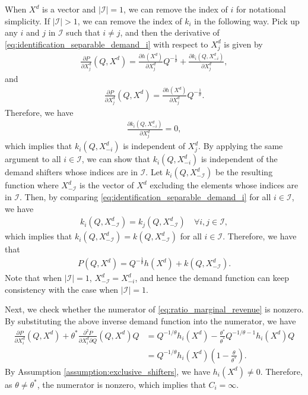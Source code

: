 \documentclass[11pt, a4paper]{article}
\theoremstyle{remark}
\begin{document}
When $X^{d}$ is a vector and $|\mathcal{I}| = 1$, we can remove the index of $i$ for notational simplicity.
If $|\mathcal{I}| > 1$, we can remove the index of $k_i$ in the following way.
Pick up any $i$ and $j$ in $\mathcal{I}$ such that $i \ne j$, and then the derivative of \eqref{eq:identification_separable_demand_i} with respect to $X^{d}_j$ is given by
\begin{align}
    \frac{\partial P}{\partial X^{d}_j}(Q, X^{d}) = \frac{\partial h(X^{d})}{\partial X^{d}_j} Q^{-\frac{1}{\theta}} + \frac{\partial k_i(Q, X^{d}_{-i})}{\partial X^{d}_j},
\end{align}
and
\begin{align}
    \frac{\partial P}{\partial X^{d}_j}(Q, X^{d}) = \frac{\partial h(X^{d})}{\partial X^{d}_j} Q^{-\frac{1}{\theta}}.
\end{align}
Therefore, we have
\begin{align}
    \frac{\partial k_i(Q, X^{d}_{-i})}{\partial X^{d}_j} = 0,
\end{align} 
which implies that $k_i(Q, X^{d}_{-i})$ is independent of $X^{d}_j$.
By applying the same argument to all $i \in \mathcal{I}$, we can show that $k_i(Q, X^{d}_{-i})$ is independent of the demand shifters whose indices are in $\mathcal{I}$.
Let $k_i(Q, X^{d}_{-\mathcal{I}})$ be the resulting function where $X^{d}_{-\mathcal{I}}$ is the vector of $X^{d}$ excluding the elements whose indices are in $\mathcal{I}$.
Then, by comparing \eqref{eq:identification_separable_demand_i} for all $i \in \mathcal{I}$, we have
\begin{align}
    k_i(Q, X^{d}_{-\mathcal{I}}) = k_j(Q, X^{d}_{-\mathcal{I}}) \quad \forall i,j \in \mathcal{I},
\end{align}
which implies that $k_i(Q, X^{d}_{-\mathcal{I}}) = k(Q, X^{d}_{-\mathcal{I}})$ for all $i \in \mathcal{I}$.
Therefore, we have that
\begin{align}
    P(Q, X^{d}) = Q^{-\frac{1}{\theta}}h(X^{d}) + k(Q, X^{d}_{-\mathcal{I}}).
\end{align}
Note that when $|\mathcal{I}| = 1$, $X^{d}_{-\mathcal{I}} = X^{d}_{-i}$, and hence the demand function can keep consistency with the case when $|\mathcal{I}| = 1$.


Next, we check whether the numerator of \eqref{eq:ratio_marginal_revenue} is nonzero.
By substituting the above inverse demand function into the numerator, we have
\begin{align}
    \frac{\partial P}{\partial X^{d}_{i}}(Q, X^{d}) + \theta^{*}\frac{\partial^2 P}{\partial X^{d}_{i}\partial Q}(Q, X^{d})Q  &= Q^{-1/\theta} h_i(X^{d}) - \frac{\theta^{*}}{\theta^{*}} Q^{-1/\theta-1} h_i(X^{d}) Q\\
    &= Q^{-1/\theta} h_i(X^{d}) \left(1 - \frac{\theta}{\theta^{*}} \right).
\end{align}
By Assumption \ref{assumption:exclusive_shifters}, we have $h_i(X^{d}) \ne 0$.
Therefore, as $\theta \ne \theta^{*}$, the numerator is nonzero, which implies that $C_i = \infty$.
\end{document}
